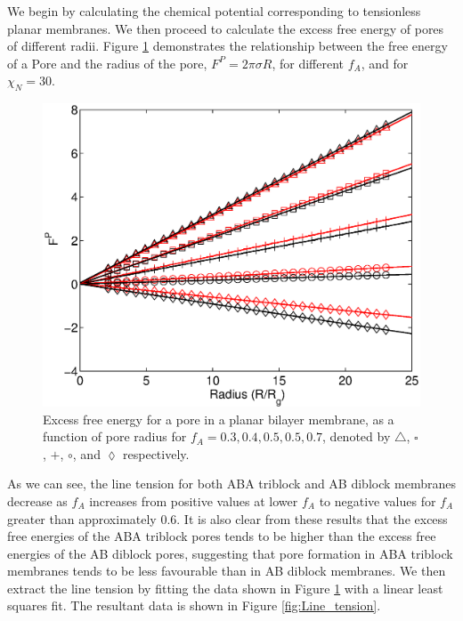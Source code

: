 \documentclass[twocolumn,aps,floatfix,nobibnotes]{revtex4-1}
\begin{document}
We begin by calculating the chemical potential corresponding to tensionless planar membranes. We then proceed to calculate the excess free energy of pores of different radii. Figure \ref{fig:Pore_FE} demonstrates the relationship between the free energy of a Pore and the radius of the pore, $F^P = 2 \pi \sigma R$, for different $f_A$, and for $\chi_N = 30$. 

\begin{figure}[htp]
\centering
\includegraphics[width=1.0\columnwidth]{Pore_fE_R.eps}
\caption{Excess free energy for a pore in a planar bilayer membrane, as a function of pore radius for $f_A = 0.3,0.4,0.5,0.5,0.7$, denoted by $\bigtriangleup$, $\square$, $+$, $\circ$, and $\lozenge$ respectively.}
\label{fig:Pore_FE}
\centering
\end{figure}

As we can see, the line tension for both ABA triblock and AB diblock membranes decrease as $f_A$ increases from positive values at lower $f_A$ to negative values for $f_A$ greater than approximately 0.6. It is also clear from these results that the excess free energies of the ABA triblock pores tends to be higher than the excess free energies of the AB diblock pores, suggesting that pore formation in ABA triblock membranes tends to be less favourable than in AB diblock membranes. We then extract the line tension by fitting the data shown in Figure \ref{fig:Pore_FE} with a linear least squares fit. The resultant data is shown in Figure \ref{fig:Line_tension}. 
\end{document}
